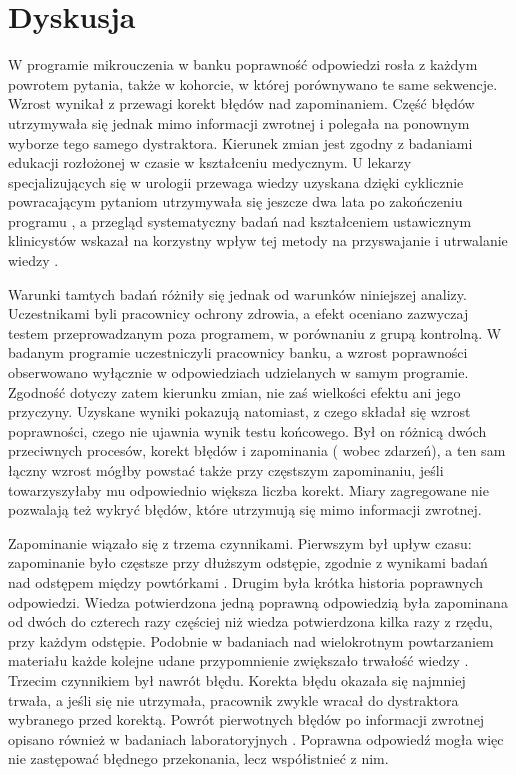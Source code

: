 \section{Dyskusja}

W programie mikrouczenia w banku poprawność odpowiedzi rosła z każdym powrotem pytania, także w kohorcie, w której
porównywano te same sekwencje. Wzrost wynikał z przewagi korekt błędów nad zapominaniem. Część błędów
utrzymywała się jednak mimo informacji zwrotnej i polegała na ponownym wyborze tego samego dystraktora.
Kierunek zmian jest zgodny z badaniami edukacji rozłożonej w czasie w kształceniu medycznym.
U lekarzy specjalizujących się w urologii przewaga wiedzy uzyskana dzięki cyklicznie powracającym
pytaniom utrzymywała się jeszcze dwa lata po zakończeniu programu \citep{kerfoot2009}, a przegląd
systematyczny badań nad kształceniem ustawicznym klinicystów wskazał na korzystny wpływ tej metody na
przyswajanie i utrwalanie wiedzy \citep{phillips2019}.

Warunki tamtych badań różniły się jednak od warunków niniejszej analizy. Uczestnikami byli pracownicy
ochrony zdrowia, a efekt oceniano zazwyczaj testem przeprowadzanym poza programem, w porównaniu
z grupą kontrolną. W badanym programie uczestniczyli pracownicy banku, a wzrost poprawności
obserwowano wyłącznie w odpowiedziach udzielanych w samym programie. Zgodność dotyczy zatem kierunku
zmian, nie zaś wielkości efektu ani jego przyczyny. Uzyskane wyniki pokazują natomiast, z czego
składał się wzrost poprawności, czego nie ujawnia wynik testu końcowego. Był on różnicą dwóch
przeciwnych procesów, korekt błędów i zapominania (\NCorrections{} wobec \NForgetting{} zdarzeń),
a ten sam łączny wzrost mógłby powstać także przy częstszym zapominaniu, jeśli towarzyszyłaby mu
odpowiednio większa liczba korekt. Miary zagregowane nie pozwalają też wykryć błędów, które
utrzymują się mimo informacji zwrotnej.

Zapominanie wiązało się z trzema czynnikami. Pierwszym był upływ czasu: zapominanie było częstsze przy
dłuższym odstępie, zgodnie z wynikami badań nad odstępem między powtórkami \citep{cepeda2006}. Drugim
była krótka historia poprawnych odpowiedzi. Wiedza potwierdzona jedną poprawną odpowiedzią była
zapominana od dwóch do czterech razy częściej niż wiedza potwierdzona kilka razy z rzędu, przy każdym
odstępie.
Podobnie w badaniach nad wielokrotnym powtarzaniem materiału każde kolejne udane przypomnienie
zwiększało trwałość wiedzy \citep{rawson2013}. Trzecim czynnikiem był nawrót błędu. Korekta błędu
okazała się najmniej trwała, a jeśli się nie utrzymała, pracownik zwykle wracał do dystraktora
wybranego przed korektą. Powrót pierwotnych błędów po informacji zwrotnej opisano również w badaniach
laboratoryjnych \citep{butler2011}. Poprawna odpowiedź mogła więc nie zastępować błędnego przekonania,
lecz współistnieć z nim.

